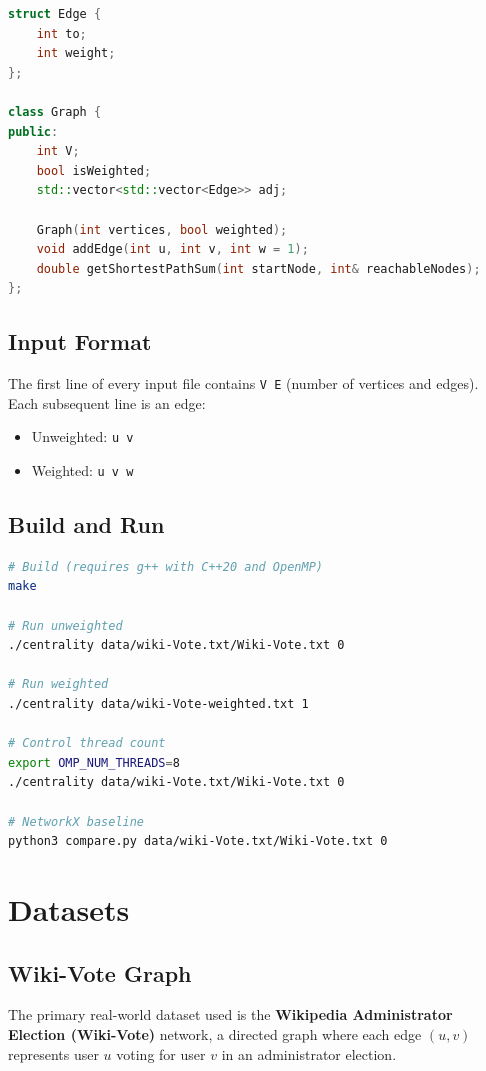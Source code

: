 \documentclass[12pt,a4paper]{article}
\begin{document}
\begin{lstlisting}[language=C++, caption={Edge struct and Graph class (graph.hpp)}]
struct Edge {
    int to;
    int weight;
};

class Graph {
public:
    int V;
    bool isWeighted;
    std::vector<std::vector<Edge>> adj;

    Graph(int vertices, bool weighted);
    void addEdge(int u, int v, int w = 1);
    double getShortestPathSum(int startNode, int& reachableNodes);
};
\end{lstlisting}

\subsection{Input Format}
The first line of every input file contains \texttt{V E} (number of vertices and edges).
Each subsequent line is an edge:
\begin{itemize}
  \item Unweighted: \texttt{u v}
  \item Weighted:   \texttt{u v w}
\end{itemize}

\subsection{Build and Run}
\begin{lstlisting}[language=bash, caption={Build and run commands}]
# Build (requires g++ with C++20 and OpenMP)
make

# Run unweighted
./centrality data/wiki-Vote.txt/Wiki-Vote.txt 0

# Run weighted
./centrality data/wiki-Vote-weighted.txt 1

# Control thread count
export OMP_NUM_THREADS=8
./centrality data/wiki-Vote.txt/Wiki-Vote.txt 0

# NetworkX baseline
python3 compare.py data/wiki-Vote.txt/Wiki-Vote.txt 0
\end{lstlisting}

\section{Datasets}
\label{sec:datasets}

\subsection{Wiki-Vote Graph}
The primary real-world dataset used is the \textbf{Wikipedia Administrator Election
(Wiki-Vote)} network, a directed graph where each edge $(u,v)$ represents user $u$ voting
for user $v$ in an administrator election.
\end{document}
